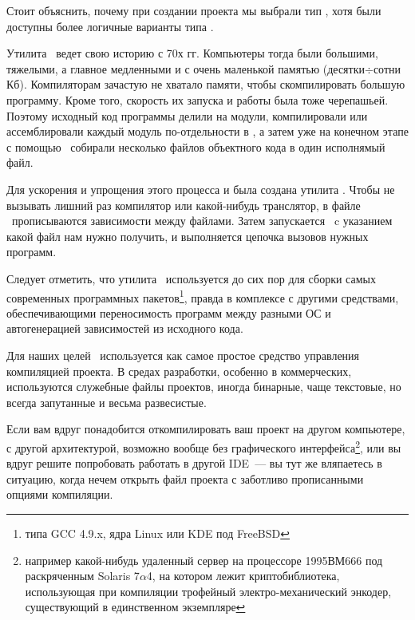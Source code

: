 \label{labmkmake}

Стоит объяснить, почему при создании проекта мы выбрали тип , хотя были доступны более логичные варианты типа .

Утилита \make\ ведет свою историю с 70х гг. Компьютеры тогда были большими,
тяжелыми, а главное медленными и с очень маленькой памятью (десятки$\div$сотни
Кб).
Компиляторам зачастую не хватало памяти, чтобы скомпилировать большую программу.
Кроме того, скорость их запуска и работы была тоже черепашьей.
Поэтому исходный код программы делили на модули, компилировали или
ассемблировали каждый модуль по-отдельности в , а затем уже
на конечном этапе с помощью \ собирали несколько файлов объектного
кода в один исполнямый файл.

Для ускорения и упрощения этого процесса и была создана утилита \make.
Чтобы не вызывать лишний раз компилятор или какой-нибудь транслятор, в файле
\makefile\ прописываются зависимости между файлами. Затем запускается \make\ c
указанием какой файл нам нужно получить, и выполняется цепочка вызовов нужных
программ.

Следует отметить, что утилита \make\ используется до сих пор для сборки самых
современных программных пакетов\footnote{типа GCC 4.9.x, ядра Linux или KDE под
FreeBSD}, правда в комплексе с другими средствами, обеспечивающими переносимость
программ между разными ОС и автогенерацией зависимостей из исходного кода.

\bigskip 
Для наших целей \make\ используется как самое простое средство
управления компиляцией проекта. В средах разработки, особенно в коммерческих,
используются служебные файлы проектов, иногда бинарные, чаще текстовые, но
всегда запутанные и весьма развесистые.

Если вам вдруг понадобится откомпилировать ваш проект на другом компьютере, с
другой архитектурой, возможно вообще без графического
интерфейса\footnote{например какой-нибудь удаленный сервер на процессоре
1995ВМ666 под раскряченным Solaris 7$\alpha$4, на котором лежит
криптобиблиотека, использующая при компиляции трофейный электро-механический
энкодер, существующий в единственном экземпляре \smiley}, или вы вдруг решите
попробовать работать в другой IDE\ --- вы тут же вляпаетесь в ситуацию, когда
нечем открыть файл проекта с заботливо прописанными опциями компиляции.

\bigskip
{}

